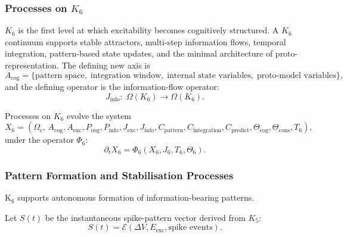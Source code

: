 

\subsubsection{Processes on \texorpdfstring{$K_6$}{K_6}}
\label{sec:processes-k6}

$K_6$ is the first level at which excitability becomes cognitively 
structured. A $K_6$ continuum supports stable attractors, 
multi-step information flows, temporal integration, 
pattern-based state updates, and the minimal architecture of 
proto-representation. The defining new axis is
\[
A_{\text{cog}} = 
\{\text{pattern space},\; 
\text{integration window},\;
\text{internal state variables},\;
\text{proto-model variables}\},
\]
and the defining operator is the information-flow operator:
\[
J_{\text{info}}:\; \Omega(K_6)\to\Omega(K_6).
\]

Processes on $K_6$ evolve the system
\[
X_6 =
(\Omega_c,\, A_{\text{cog}}, A_{\text{exc}}, 
P_{\text{cog}}, P_{\text{info}}, 
J_{\text{exc}}, J_{\text{info}}, 
C_{\text{pattern}}, C_{\text{integration}}, 
C_{\text{predict}}, 
\Theta_{\text{cog}}, \Theta_{\text{cons}}, 
T_6),
\]
under the operator $\Phi_6$:
\[
\partial_t X_6 = \Phi_6(X_6, J_6, T_6, \Theta_6).
\]

\subsubsection{Pattern Formation and Stabilisation Processes}

K$_6$ supports autonomous formation of information-bearing patterns.

Let $S(t)$ be the instantaneous spike-pattern vector derived from $K_5$:
\[
S(t)=\mathcal{E}(\Delta V, E_{\text{exc}},\text{spike\ events}).
\]


